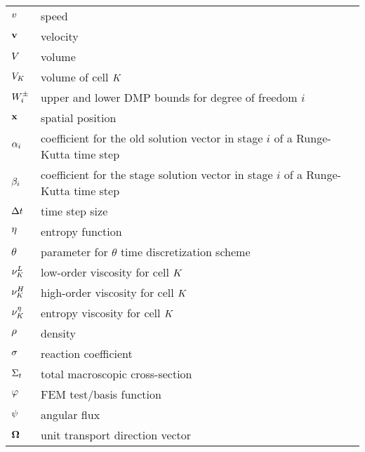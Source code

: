 \begin{center}
\begin{longtable}{l p{4.8in}}
$v$           & speed\\
$\mathbf{v}$        & velocity\\
$V$          & volume\\
$V_K$      & volume of cell $K$\\
$W^\pm_i$      & upper and lower DMP bounds for degree of freedom $i$\\
$\mathbf{x}$               & spatial position\\
$\alpha_i$ & coefficient for the old solution vector in stage
                         $i$ of a Runge-Kutta time step\\
$\beta_i$ & coefficient for the stage solution vector in stage
                           $i$ of a Runge-Kutta time step\\
$\Delta t$    & time step size\\
$\eta$         & entropy function\\
$\theta$           & parameter for $\theta$ time discretization scheme\\

$\nu_K^L$    & low-order viscosity for cell $K$\\
$\nu_K^H$   & high-order viscosity for cell $K$\\
$\nu_K^\eta$     & entropy viscosity for cell $K$\\
$\rho$         & density\\
$\sigma$    & reaction coefficient\\
$\Sigma_t$ & total macroscopic cross-section\\
$\varphi$    & FEM test/basis function\\
$\psi$     & angular flux\\
$\mathbf{\Omega}$ & unit transport direction vector\\
\end{longtable}
\end{center}

\pagebreak{}
